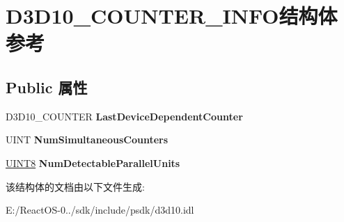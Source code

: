 \hypertarget{struct_d3_d10___c_o_u_n_t_e_r___i_n_f_o}{}\section{D3\+D10\+\_\+\+C\+O\+U\+N\+T\+E\+R\+\_\+\+I\+N\+F\+O结构体 参考}
\label{struct_d3_d10___c_o_u_n_t_e_r___i_n_f_o}
\subsection*{Public 属性}
\begin{DoxyCompactItemize}
\item 
\mbox{\label{struct_d3_d10___c_o_u_n_t_e_r___i_n_f_o_aa0c8418ddd06b279853b03c762492bc4}} 
D3\+D10\+\_\+\+C\+O\+U\+N\+T\+ER {\bfseries Last\+Device\+Dependent\+Counter}
\item 
\mbox{\label{struct_d3_d10___c_o_u_n_t_e_r___i_n_f_o_a1bc2a468fe5f1dbc30bbacf3e1773968}} 
U\+I\+NT {\bfseries Num\+Simultaneous\+Counters}
\item 
\mbox{\label{struct_d3_d10___c_o_u_n_t_e_r___i_n_f_o_ad2ce8052b7333b62976d3bbde3dc8348}} 
\hyperlink{_processor_bind_8h_ab27e9918b538ce9d8ca692479b375b6a}{U\+I\+N\+T8} {\bfseries Num\+Detectable\+Parallel\+Units}
\end{DoxyCompactItemize}


该结构体的文档由以下文件生成\+:\begin{DoxyCompactItemize}
\item 
E\+:/\+React\+O\+S-\/0../sdk/include/psdk/d3d10.\+idl\end{DoxyCompactItemize}

